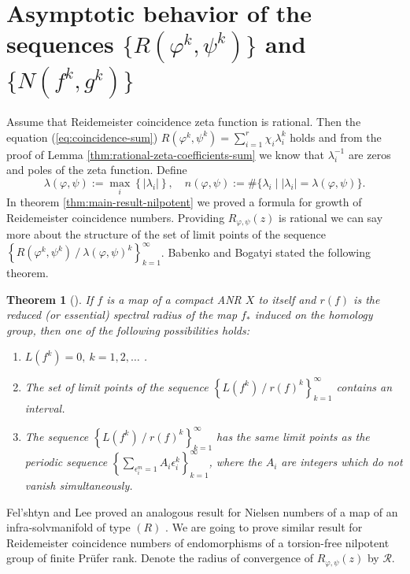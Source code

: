 \documentclass[12pt, a4paper]{amsart}
\newtheorem{theorem}{Theorem}
\begin{document}
\bigskip
\section{Asymptotic behavior of the sequences $\{R(\varphi^k, \psi^k)\}$
    and $\{N(f^k, g^k)\}$}\label{sec:asymptotic}

Assume that Reidemeister coincidence zeta function is rational.
Then the equation (\ref{eq:coincidence-sum}) $R(\varphi^k, \psi^k) = \sum_{i=1}^{r} \chi_i \lambda_i^k$
holds and from the proof of Lemma \ref{thm:rational-zeta-coefficients-sum} we know that $\lambda_i^{-1}$
are zeros and poles of the zeta function.
Define
\begin{equation}\label{eq:lambda-def}
    \lambda(\varphi, \psi) := \max_i \left\{ |\lambda_i| \right\}, \quad
    n(\varphi, \psi) := \#\{ \lambda_i \mid |\lambda_i| = \lambda(\varphi, \psi) \}.
\end{equation}
In theorem \ref{thm:main-result-nilpotent} we proved a formula for growth of Reidemeister coincidence numbers.
Providing $R_{\varphi, \psi}(z)$ is rational we can say more about the structure of the set of limit points
of the sequence $\left\{ R(\varphi^k, \psi^k) \ / \ \lambda(\varphi, \psi)^k \right\}_{k=1}^\infty$.
Babenko and Bogatyi stated the following theorem.

\begin{theorem}[]\label{thm:BaBo-trichotomy}
  If $f$ is a map of a compact ANR $X$ to itself and $r(f)$ is the reduced (or essential) spectral radius
  of the map $f_*$ induced on the homology group, then one of the following possibilities holds:
  \begin{enumerate}
      \item[(i)] $L(f^k) = 0, \ k=1,2,\dots$ .
      \item[(ii)] The set of limit points of the sequence $\left\{ L(f^k) \ / \ r(f)^k \right\}_{k=1}^\infty$
        contains an interval.
      \item[(iii)] The sequence $\left\{ L(f^k) \ / \ r(f)^k \right\}_{k=1}^\infty$ has the same limit points
        as the periodic sequence $\left\{ \sum_{\epsilon_i^m=1} A_i \epsilon_i^k \right\}_{k=1}^\infty$,
        where the $A_i$ are integers which do not vanish simultaneously.
  \end{enumerate}
\end{theorem}

Fel'shtyn and Lee proved an analogous result for Nielsen numbers of a map of an infra-solvmanifold of type $(R)$ \cite[Theorem 4.1]{FelsLee}.
We are going to prove similar result for Reidemeister coincidence numbers of endomorphisms
of a torsion-free nilpotent group of finite Pr\"ufer rank.
Denote the radius of convergence of $R_{\varphi, \psi}(z)$ by $\mathcal{R}$.
\end{document}
